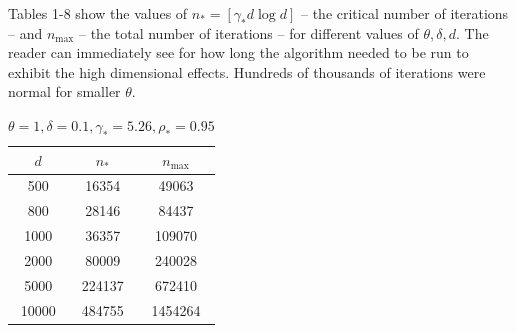 \documentclass[12pt]{article}
\begin{document}




\medskip

Tables 1-8 show the values of $n_*=[\gamma_*d\log d]$ -- the critical number of iterations -- and $n_{\max}$ -- the total number of iterations -- for different values of $\theta,\delta,d$. The reader can immediately see for how long the algorithm needed to be run to exhibit the high dimensional effects. Hundreds of thousands of iterations were normal for smaller $\theta$.

\begin{table}[p]
    \centering
    \begin{tabular}{|c|c|c|}
        \hline
        $d$ & $n_*$ & $n_{\max}$ \\
        \hline
        500 & 16354 & 49063\\
        800 & 28146 & 84437\\
        1000 & 36357 & 109070 \\
        2000 & 80009 & 240028 \\
        5000 & 224137 & 672410 \\
        10000 & 484755 & 1454264\\
        \hline
    \end{tabular}
    \caption{$\theta=1,\delta=0.1,\gamma_*=5.26,\rho_*=0.95$}
\end{table}
\end{document}

